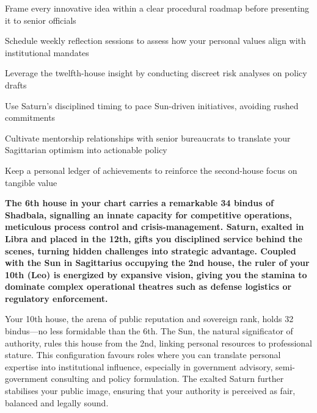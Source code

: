 \begin{diamondlist}
  \item {\fontsize{8.5}{12}\selectfont Frame every innovative idea within a clear procedural roadmap before presenting it to senior officials}
  \item {\fontsize{8.5}{12}\selectfont Schedule weekly reflection sessions to assess how your personal values align with institutional mandates}
  \item {\fontsize{8.5}{12}\selectfont Leverage the twelfth-house insight by conducting discreet risk analyses on policy drafts}
  \item {\fontsize{8.5}{12}\selectfont Use Saturn's disciplined timing to pace Sun-driven initiatives, avoiding rushed commitments}
  \item {\fontsize{8.5}{12}\selectfont Cultivate mentorship relationships with senior bureaucrats to translate your Sagittarian optimism into actionable policy}
  \item {\fontsize{8.5}{12}\selectfont Keep a personal ledger of achievements to reinforce the second-house focus on tangible value}
\end{diamondlist}


\label{topic46}

{\fontsize{9.5}{13.8}\selectfont\bfseries\color{DeepSlate} The 6th house in your chart carries a remarkable 34 bindus of Shadbala, signalling an innate capacity for competitive operations, meticulous process control and crisis-management. Saturn, exalted in Libra and placed in the 12th, gifts you disciplined service behind the scenes, turning hidden challenges into strategic advantage. Coupled with the Sun in Sagittarius occupying the 2nd house, the ruler of your 10th (Leo) is energized by expansive vision, giving you the stamina to dominate complex operational theatres such as defense logistics or regulatory enforcement.}\par\vspace{2mm}

{\fontsize{9}{13}\selectfont Your 10th house, the arena of public reputation and sovereign rank, holds 32 bindus---no less formidable than the 6th. The Sun, the natural significator of authority, rules this house from the 2nd, linking personal resources to professional stature. This configuration favours roles where you can translate personal expertise into institutional influence, especially in government advisory, semi-government consulting and policy formulation. The exalted Saturn further stabilises your public image, ensuring that your authority is perceived as fair, balanced and legally sound.}\par\vspace{1.8mm}

